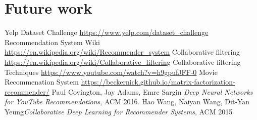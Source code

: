 \documentclass[11pt]{article}
\begin{document}
	
	
	\section{Future work}
	
	
	\begin{thebibliography}{9}
		
	 Yelp Dataset Challenge \url{https://www.yelp.com/dataset_challenge}
	 Recommendation System Wiki \url{https://en.wikipedia.org/wiki/Recommender_system}
	Collaborative filtering \url{https://en.wikipedia.org/wiki/Collaborative_filtering}
		Collaborative filtering Techniques \url{https://www.youtube.com/watch?v=h9gpufJFF-0}
		Movie Recommenation System \url{https://beckernick.github.io/matrix-factorization-recommender/}
	 Paul Covington, Jay Adams, Emre Sargin \textit{Deep Neural Networks for YouTube Recommendations}, ACM 2016.
	 Hao Wang, Naiyan Wang, Dit-Yan Yeung\textit{Collaborative Deep Learning for Recommender Systems}, ACM 2015
	\end{thebibliography}
	
	
	
	
	
	
\end{document}
